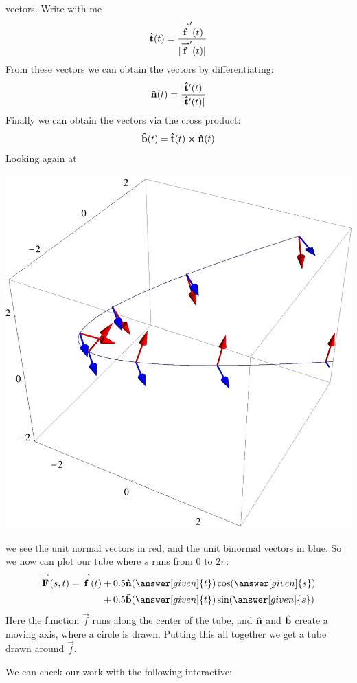 \documentclass{ximera}
\begin{document}
\begin{example}
\begin{explanation}
    vectors. Write with me
    \[
    \mathbf{\hat{t}}(t) = \frac{{\overset{\boldsymbol{\rightharpoonup}}{\mathbf{f}}}'(t)}{|{\overset{\boldsymbol{\rightharpoonup}}{\mathbf{f}}}'(t)|}
    \]
    From these vectors we can obtain the 
    vectors by differentiating:
    \[
    \mathbf{\hat{n}}(t) = \frac{\mathbf{\hat{t}}'(t)}{|\mathbf{\hat{t}}'(t)|}
    \]
    Finally we can obtain the 
    vectors via the cross product:
    \[
    \mathbf{\hat{b}}(t) = \mathbf{\hat{t}}(t) \boldsymbol\times \mathbf{\hat{n}}(t)
    \]
    Looking again at
    \begin{image}
      \includegraphics{paraArrows.jpg}
    \end{image}
    we see the unit normal vectors in red, and the unit binormal
    vectors in blue. So we now can plot our tube where $s$ runs from
    $0$ to $2\pi$:
    \begin{align*}
      \vec{F}(s,t) = \vec{f}(t) &+ 0.5 \unormal(\answer[given]{t})\cos(\answer[given]{s})\\
      &+ 0.5 \ubinormal(\answer[given]{t})\sin(\answer[given]{s})
    \end{align*}
    Here the function $\vec{f}$ runs along the center of the tube, and
    $\mathbf{\hat{n}}$ and $\mathbf{\hat{b}}$ create a moving axis, where a circle is
    drawn. Putting this all together we get a tube drawn around
    $\vec{f}$.
    \begin{onlineOnly}
      We can check our work with the following interactive:
      \begin{center}
      \end{center}
    \end{onlineOnly}
  \end{explanation}
\end{example}
\end{document}
